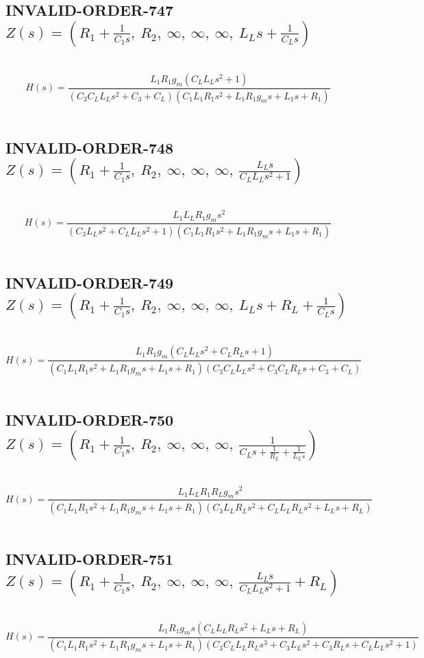 \documentclass{article}
\begin{document}
\subsection{INVALID-ORDER-747 $Z(s) = \left( R_{1} + \frac{1}{C_{1} s}, \  R_{2}, \  \infty, \  \infty, \  \infty, \  L_{L} s + \frac{1}{C_{L} s}\right)$ } \ 
\textbf{\[H(s) = \frac{L_{1} R_{1} g_{m} \left(C_{L} L_{L} s^{2} + 1\right)}{\left(C_{3} C_{L} L_{L} s^{2} + C_{3} + C_{L}\right) \left(C_{1} L_{1} R_{1} s^{2} + L_{1} R_{1} g_{m} s + L_{1} s + R_{1}\right)}\] } \ 
\subsection{INVALID-ORDER-748 $Z(s) = \left( R_{1} + \frac{1}{C_{1} s}, \  R_{2}, \  \infty, \  \infty, \  \infty, \  \frac{L_{L} s}{C_{L} L_{L} s^{2} + 1}\right)$ } \ 
\textbf{\[H(s) = \frac{L_{1} L_{L} R_{1} g_{m} s^{2}}{\left(C_{3} L_{L} s^{2} + C_{L} L_{L} s^{2} + 1\right) \left(C_{1} L_{1} R_{1} s^{2} + L_{1} R_{1} g_{m} s + L_{1} s + R_{1}\right)}\] } \ 
\subsection{INVALID-ORDER-749 $Z(s) = \left( R_{1} + \frac{1}{C_{1} s}, \  R_{2}, \  \infty, \  \infty, \  \infty, \  L_{L} s + R_{L} + \frac{1}{C_{L} s}\right)$ } \ 
\textbf{\[H(s) = \frac{L_{1} R_{1} g_{m} \left(C_{L} L_{L} s^{2} + C_{L} R_{L} s + 1\right)}{\left(C_{1} L_{1} R_{1} s^{2} + L_{1} R_{1} g_{m} s + L_{1} s + R_{1}\right) \left(C_{3} C_{L} L_{L} s^{2} + C_{3} C_{L} R_{L} s + C_{3} + C_{L}\right)}\] } \ 
\subsection{INVALID-ORDER-750 $Z(s) = \left( R_{1} + \frac{1}{C_{1} s}, \  R_{2}, \  \infty, \  \infty, \  \infty, \  \frac{1}{C_{L} s + \frac{1}{R_{L}} + \frac{1}{L_{L} s}}\right)$ } \ 
\textbf{\[H(s) = \frac{L_{1} L_{L} R_{1} R_{L} g_{m} s^{2}}{\left(C_{1} L_{1} R_{1} s^{2} + L_{1} R_{1} g_{m} s + L_{1} s + R_{1}\right) \left(C_{3} L_{L} R_{L} s^{2} + C_{L} L_{L} R_{L} s^{2} + L_{L} s + R_{L}\right)}\] } \ 
\subsection{INVALID-ORDER-751 $Z(s) = \left( R_{1} + \frac{1}{C_{1} s}, \  R_{2}, \  \infty, \  \infty, \  \infty, \  \frac{L_{L} s}{C_{L} L_{L} s^{2} + 1} + R_{L}\right)$ } \ 
\textbf{\[H(s) = \frac{L_{1} R_{1} g_{m} s \left(C_{L} L_{L} R_{L} s^{2} + L_{L} s + R_{L}\right)}{\left(C_{1} L_{1} R_{1} s^{2} + L_{1} R_{1} g_{m} s + L_{1} s + R_{1}\right) \left(C_{3} C_{L} L_{L} R_{L} s^{3} + C_{3} L_{L} s^{2} + C_{3} R_{L} s + C_{L} L_{L} s^{2} + 1\right)}\] } \ 
\end{document}
